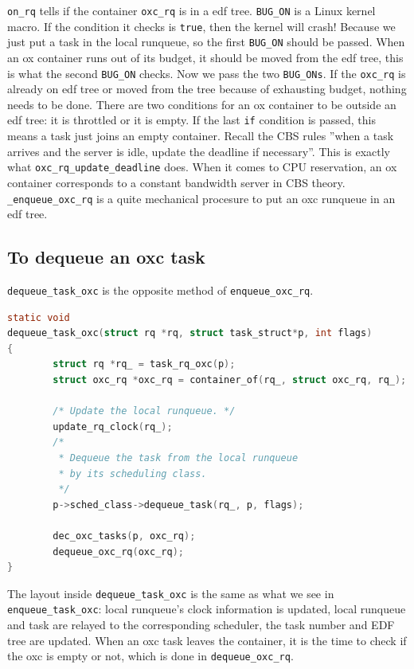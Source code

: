 \texttt{on\_rq} tells if the container \texttt{oxc\_rq} is in a edf tree.
\texttt{BUG\_ON} is a Linux kernel macro. If the condition it checks is 
\texttt{true}, then the kernel will crash! Because we just put a task
in the local runqueue, so the first \texttt{BUG\_ON} should be passed.
When an ox container runs out of its budget, it should be moved from the
edf tree, this is what the second \texttt{BUG\_ON} checks. Now we pass
the two \texttt{BUG\_ONs}. If the \texttt{oxc\_rq} is already on edf 
tree or moved from the tree because of exhausting budget, nothing needs 
to be done. There are two conditions for an ox container to be outside
an edf tree: it is throttled or it is empty. If the last \texttt{if}
condition is passed, this means a task just joins an empty container. 
Recall the CBS rules ''when a task arrives and the server is idle, update 
the deadline if necessary''. This is exactly what 
\texttt{oxc\_rq\_update\_deadline} does. When it comes to CPU reservation,
an ox container corresponds to a constant bandwidth server in CBS theory.
\texttt{\_enqueue\_oxc\_rq} is a quite mechanical procesure to put an
oxc runqueue in an edf tree.

\subsection{To dequeue an oxc task\label{sec:dequeue_task_oxc}}

\texttt{dequeue\_task\_oxc} is the opposite method of 
\texttt{enqueue\_oxc\_rq}.

\begin{lstlisting}[language=C, 
		caption={To remove a task from the oxc local runqueue}]
static void 
dequeue_task_oxc(struct rq *rq, struct task_struct*p, int flags)
{
        struct rq *rq_ = task_rq_oxc(p);
        struct oxc_rq *oxc_rq = container_of(rq_, struct oxc_rq, rq_);

        /* Update the local runqueue. */
        update_rq_clock(rq_);
        /*
         * Dequeue the task from the local runqueue 
         * by its scheduling class.
         */
        p->sched_class->dequeue_task(rq_, p, flags);

        dec_oxc_tasks(p, oxc_rq);
        dequeue_oxc_rq(oxc_rq);
}
\end{lstlisting}

The layout inside \texttt{dequeue\_task\_oxc} is the same as what we see in
\texttt{enqueue\_task\_oxc}: local runqueue's clock information is updated,
local runqueue and task are relayed to the corresponding scheduler, 
the task number and EDF tree are updated. When an oxc task leaves the 
container, it is the time to check if the oxc is empty or not, which is 
done in \texttt{dequeue\_oxc\_rq}.

